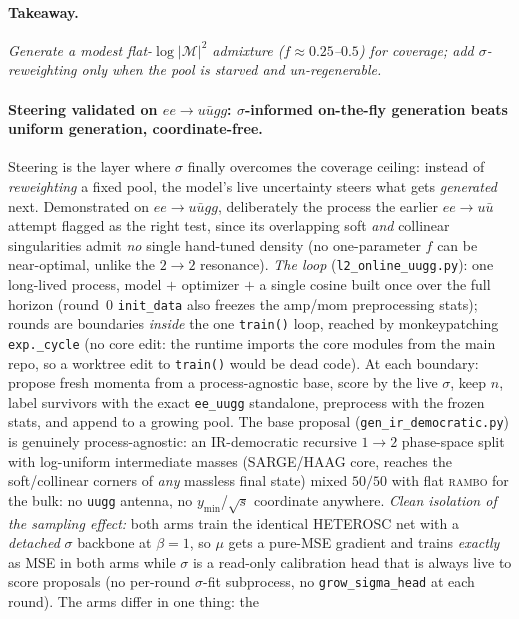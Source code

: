 \documentclass[11pt]{article}
\newcommand{\code}[1]{\texttt{#1}}
\begin{document}
\paragraph{Takeaway.} \emph{Generate a modest flat-$\log|\mathcal{M}|^2$ admixture
($f\!\approx\!0.25$--$0.5$) for coverage; add $\sigma$-reweighting only when the pool is starved and
un-regenerable.}

\paragraph{Steering validated on $ee\to u\bar u gg$: $\sigma$-informed on-the-fly generation beats
uniform generation, coordinate-free.} Steering is the layer where $\sigma$ finally overcomes the
coverage ceiling: instead of \emph{reweighting} a fixed pool, the model's live uncertainty steers what
gets \emph{generated} next. Demonstrated on $ee\to u\bar u gg$, deliberately the process the
earlier $ee\to u\bar u$ attempt flagged as the right test, since its overlapping soft \emph{and}
collinear singularities admit \emph{no} single hand-tuned density (no one-parameter $f$ can be
near-optimal, unlike the $2\!\to\!2$ resonance). \emph{The loop} (\code{l2\_online\_uugg.py}): one
long-lived process, model $+$ optimizer $+$ a single cosine built once over the full horizon
(round~0 \code{init\_data} also freezes the amp/mom preprocessing stats); rounds are boundaries
\emph{inside} the one \code{train()} loop, reached by monkeypatching \code{exp.\_cycle} (no core
edit: the runtime imports the core modules from the main repo, so a worktree edit to \code{train()}
would be dead code). At each boundary: propose fresh momenta from a process-agnostic base, score by
the live $\sigma$, keep $n$, label survivors with the exact \code{ee\_uugg} standalone, preprocess
with the frozen stats, and append to a growing pool. The base proposal
(\code{gen\_ir\_democratic.py}) is genuinely process-agnostic: an IR-democratic recursive $1\!\to\!2$
phase-space split with log-uniform intermediate masses (SARGE/HAAG core, reaches the soft/collinear
corners of \emph{any} massless final state) mixed $50/50$ with flat \textsc{rambo} for the bulk: no
\code{uugg} antenna, no $y_{\min}$/$\sqrt s$ coordinate anywhere. \emph{Clean isolation of the
sampling effect:} both arms train the identical HETEROSC net with a \emph{detached} $\sigma$ backbone
at $\beta{=}1$, so $\mu$ gets a pure-MSE gradient and trains \emph{exactly} as MSE in both arms while
$\sigma$ is a read-only calibration head that is always live to score proposals (no per-round
$\sigma$-fit subprocess, no \code{grow\_sigma\_head} at each round). The arms differ in one thing: the
\end{document}
